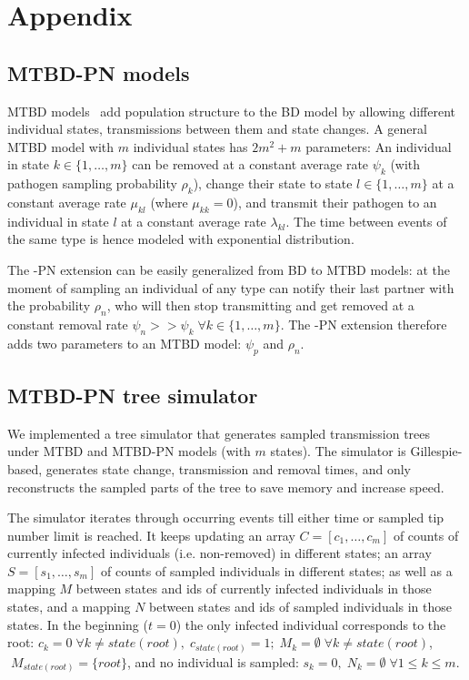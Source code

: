 \documentclass[a4paper,10pt]{article}
\begin{document}



\section{Appendix}
\subsection{MTBD-PN models}
MTBD models~\citep{Stadler2013a} add population structure to the BD model by allowing different individual states, transmissions between them and state changes. A general MTBD model with $m$ individual states has $2m^2 + m$ parameters: An individual in state $k \in \{1, \ldots, m\}$ can be removed at a constant average rate $\psi_k$ (with pathogen sampling probability $\rho_k$), change their state to state $l \in \{1, \ldots, m\}$ at a constant average rate $\mu_{kl}$ (where $\mu_{kk} = 0$), and transmit their pathogen to an individual in state $l$ at a constant average rate $\lambda_{kl}$. The time between events of the same type is hence modeled with exponential distribution.

The -PN extension can be easily generalized from BD to MTBD models: at the moment of sampling an individual of any type can notify their last partner with the probability $\rho_n$, who will then stop transmitting and get removed at a constant removal rate $\psi_n >> \psi_k \; \forall k \in \{1, \ldots, m\}$. The -PN extension therefore adds two parameters to an MTBD model: $\psi_p$ and $\rho_n$.

\subsection{MTBD-PN tree simulator}

We implemented a tree simulator that generates sampled transmission trees under MTBD and MTBD-PN models (with $m$ states). The simulator is Gillespie-based, generates state change, transmission and removal times, and only reconstructs the sampled parts of the tree to save memory and increase speed. 

The simulator iterates through occurring events till either time or sampled tip number limit is reached. 
It keeps updating an array $C = [c_1, \ldots, c_m]$ of counts of currently infected individuals (i.e. non-removed) in different states; an array $S = [s_1, \ldots, s_m]$ of counts of sampled individuals in different states; as well as a mapping $M$ between states and ids of currently infected individuals in those states, and a mapping $N$ between states and ids of sampled individuals in those states.  In the beginning ($t=0$) the only infected individual corresponds to the root: $c_k = 0 \;\forall k \neq state(root), \;c_{state(root)} = 1; \;M_k = \emptyset \; \forall k \neq state(root)$, $ \; M_{state(root)} = \{root\}$, and no individual is sampled: $s_k=0,\;N_k = \emptyset \; \forall 1 \leq k \leq m$.
\end{document}
